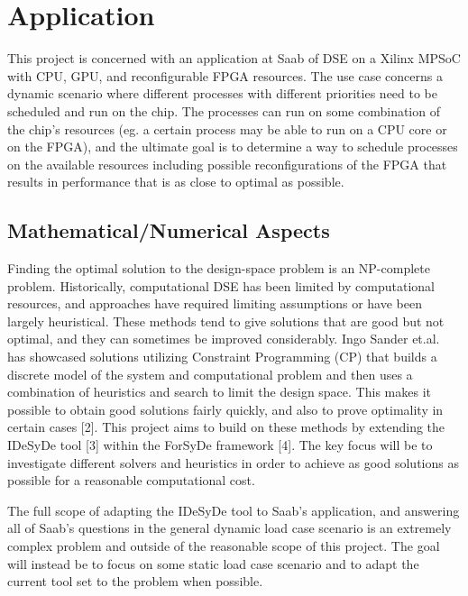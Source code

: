 \documentclass[12pt,notitlepage]{article}
\begin{document}
\section{Application}
This project is concerned with an application at Saab of DSE on a Xilinx MPSoC with CPU, GPU, and reconfigurable FPGA resources. The use case concerns a dynamic scenario where different processes with different priorities need to be scheduled and run on the chip. The processes can run on some combination of the chip's resources (eg. a certain process may be able to run on a CPU core or on the FPGA), and the ultimate goal is to determine a way to schedule processes on the available resources including possible reconfigurations of the FPGA that results in performance that is as close to optimal as possible.

\subsection{Mathematical/Numerical Aspects}
Finding the optimal solution to the design-space problem is an NP-complete problem. Historically, computational DSE has been limited by computational resources, and approaches have required limiting assumptions or have been largely heuristical. These methods tend to give solutions that are good but not optimal, and they can sometimes be improved considerably. Ingo Sander et.al. has showcased solutions utilizing Constraint Programming (CP) that builds a discrete model of the system and computational problem and then uses a combination of heuristics and search to limit the design space. This makes it possible to obtain good solutions fairly quickly, and also to prove optimality in certain cases [2]. This project aims to build on these methods by extending the IDeSyDe tool [3] within the ForSyDe framework [4]. The key focus will be to investigate different solvers and heuristics in order to achieve as good solutions as possible for a reasonable computational cost.

The full scope of adapting the IDeSyDe tool to Saab's application, and answering all of Saab's questions in the general dynamic load case scenario is an extremely complex problem and outside of the reasonable scope of this project. The goal will instead be to focus on some static load case scenario and to adapt the current tool set to the problem when possible.
\end{document}
